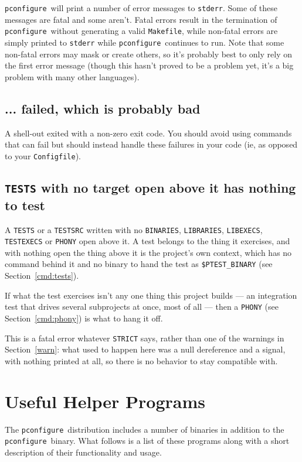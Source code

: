 \documentclass{article}
\newcommand{\pconfigure}{\texttt{pconfigure}}
\begin{document}
\pconfigure\ will print a number of error messages to \texttt{stderr}.
Some of these messages are fatal and some aren't.  Fatal errors result
in the termination of \pconfigure\ without generating a valid
\texttt{Makefile}, while non-fatal errors are simply printed to
\texttt{stderr} while \pconfigure\ continues to run.  Note that some
non-fatal errors may mask or create others, so it's probably best to
only rely on the first error message (though this hasn't proved to be
a problem yet, it's a big problem with many other languages). %

\subsection{... failed, which is probably bad}

A shell-out exited with a non-zero exit code.  You should avoid using
commands that can fail but should instead handle these failures in
your code (ie, as opposed to your \texttt{Configfile}).

\subsection{\texttt{TESTS} with no target open above it has nothing to test}

A \texttt{TESTS} or a \texttt{TESTSRC} written with no
\texttt{BINARIES}, \texttt{LIBRARIES}, \texttt{LIBEXECS},
\texttt{TESTEXECS} or \texttt{PHONY} open above it.  A test belongs to
the thing it exercises, and with nothing open the thing above it is
the project's own context, which has no command behind it and no
binary to hand the test as \texttt{\$PTEST\_BINARY} (see
Section~\ref{cmd:tests}).

If what the test exercises isn't any one thing this project builds ---
an integration test that drives several subprojects at once, most of
all --- then a \texttt{PHONY} (see Section~\ref{cmd:phony}) is what to
hang it off.

This is a fatal error whatever \texttt{STRICT} says, rather than one
of the warnings in Section~\ref{warn}: what used to happen here was a
null dereference and a signal, with nothing printed at all, so there
is no behavior to stay compatible with.

\section{Useful Helper Programs \label{prog}}

The \pconfigure\ distribution includes a number of binaries in
addition to the \pconfigure\ binary.  What follows is a list of these
programs along with a short description of their functionality and
usage.
\end{document}
